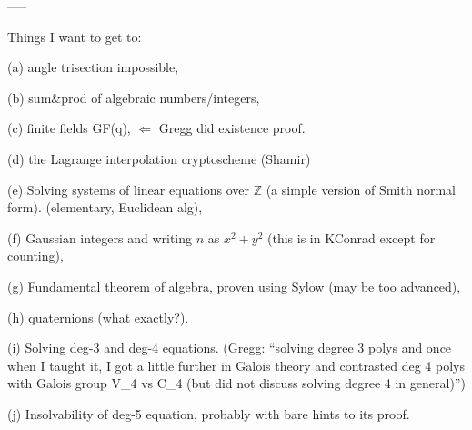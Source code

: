 \documentclass[numbers=enddot,12pt,final,onecolumn,notitlepage]{scrartcl}%
\theoremstyle{definition}
\newenvironment{noncompile}{}{}
\begin{document}
\begin{noncompile}
-----

Things I want to get to:

(a) angle trisection impossible,

(b) sum\&prod of algebraic numbers/integers,

(c) finite fields GF(q), $\Longleftarrow$ Gregg did existence proof.

(d) the Lagrange interpolation cryptoscheme (Shamir)

(e) Solving systems of linear equations over $\mathbb{Z}$ (a simple version of
Smith normal form). (elementary, Euclidean alg),

(f) Gaussian integers and writing $n$ as $x^{2}+y^{2}$ (this is in KConrad
except for counting),

(g) Fundamental theorem of algebra, proven using Sylow (may be too advanced),

(h) quaternions (what exactly?).

(i) Solving deg-3 and deg-4 equations. (Gregg: \textquotedblleft solving
degree 3 polys and once when I taught it, I got a little further in Galois
theory and contrasted deg 4 polys with Galois group V\_4 vs C\_4 (but did not
discuss solving degree 4 in general)\textquotedblright)

(j) Insolvability of deg-5 equation, probably with bare hints to its proof.
\end{noncompile}
\end{document}
